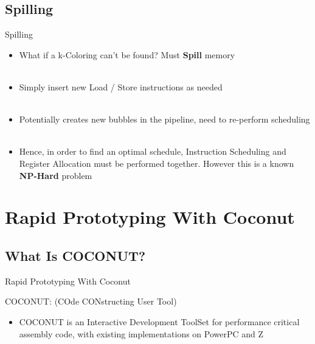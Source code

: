 \documentclass{beamer}
\begin{document}
\begin{darkframes}
\subsection{Spilling}
\begin{frame}{Spilling}
	\begin{itemize}
		\item What if a \alert{k-Coloring} can't be found? Must {\bf \color{green} Spill} memory \\
		\qquad \\
		\item Simply insert new \alert{Load / Store} instructions as needed \\
		\qquad \\

		\item Potentially \alert{creates new bubbles} in the pipeline, need to re-perform scheduling \\
      \qquad \\
      
    \item Hence, in order to find an optimal schedule, \alert{Instruction
        Scheduling and Register Allocation must be performed together}. However
      this is a known {\bf \color{green}NP-Hard} problem
	\end{itemize}
\end{frame}

\section{Rapid Prototyping With Coconut}

\subsection{What Is COCONUT?}
\begin{frame}{Rapid Prototyping With Coconut}

	\alert{COCONUT}: (\alert{CO}de \alert{CON}structing \alert{U}ser \alert{T}ool) \\
	\begin{itemize}
	    \item COCONUT is an {\color{green} Interactive Development ToolSet}
        for performance critical assembly code, with existing implementations on
        {\color{green} PowerPC and Z}
	\end{itemize}


\end{frame}
\end{darkframes}
\end{document}
